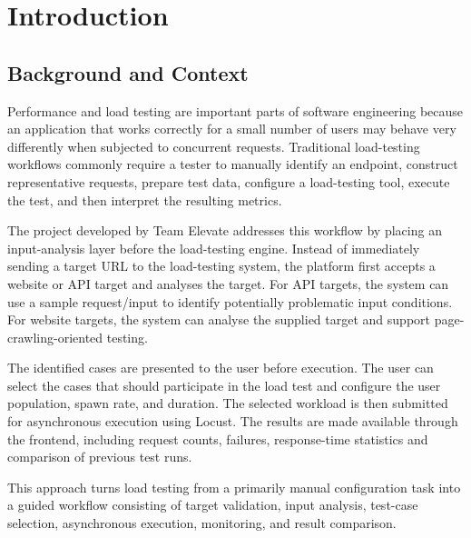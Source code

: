 \documentclass{tietreport}
\author{%
  \texttt{[roll no.]} Anant Agrawal \\
  \texttt{[roll no.]} Piyush Singh \\
  \texttt{[roll no.]} Vivek Pandey%
}
\begin{document}
\maketitle

\tableofcontents


\chapter{Introduction}

\section{Background and Context}

Performance and load testing are important parts of software engineering because an application that works correctly for a small number of users may behave very differently when subjected to concurrent requests. Traditional load-testing workflows commonly require a tester to manually identify an endpoint, construct representative requests, prepare test data, configure a load-testing tool, execute the test, and then interpret the resulting metrics.

The project developed by Team Elevate addresses this workflow by placing an input-analysis layer before the load-testing engine. Instead of immediately sending a target URL to the load-testing system, the platform first accepts a website or API target and analyses the target. For API targets, the system can use a sample request/input to identify potentially problematic input conditions. For website targets, the system can analyse the supplied target and support page-crawling-oriented testing.

The identified cases are presented to the user before execution. The user can select the cases that should participate in the load test and configure the user population, spawn rate, and duration. The selected workload is then submitted for asynchronous execution using Locust. The results are made available through the frontend, including request counts, failures, response-time statistics and comparison of previous test runs.

This approach turns load testing from a primarily manual configuration task into a guided workflow consisting of target validation, input analysis, test-case selection, asynchronous execution, monitoring, and result comparison.
\end{document}
